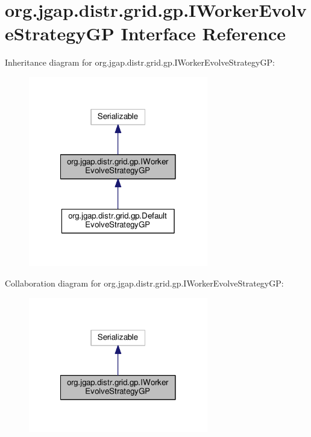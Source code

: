 \hypertarget{interfaceorg_1_1jgap_1_1distr_1_1grid_1_1gp_1_1_i_worker_evolve_strategy_g_p}{\section{org.\-jgap.\-distr.\-grid.\-gp.\-I\-Worker\-Evolve\-Strategy\-G\-P Interface Reference}
\label{interfaceorg_1_1jgap_1_1distr_1_1grid_1_1gp_1_1_i_worker_evolve_strategy_g_p}
}


Inheritance diagram for org.\-jgap.\-distr.\-grid.\-gp.\-I\-Worker\-Evolve\-Strategy\-G\-P\-:
\nopagebreak
\begin{figure}[H]
\begin{center}
\leavevmode
\includegraphics[width=222pt]{interfaceorg_1_1jgap_1_1distr_1_1grid_1_1gp_1_1_i_worker_evolve_strategy_g_p__inherit__graph}
\end{center}
\end{figure}


Collaboration diagram for org.\-jgap.\-distr.\-grid.\-gp.\-I\-Worker\-Evolve\-Strategy\-G\-P\-:
\nopagebreak
\begin{figure}[H]
\begin{center}
\leavevmode
\includegraphics[width=222pt]{interfaceorg_1_1jgap_1_1distr_1_1grid_1_1gp_1_1_i_worker_evolve_strategy_g_p__coll__graph}
\end{center}
\end{figure}
